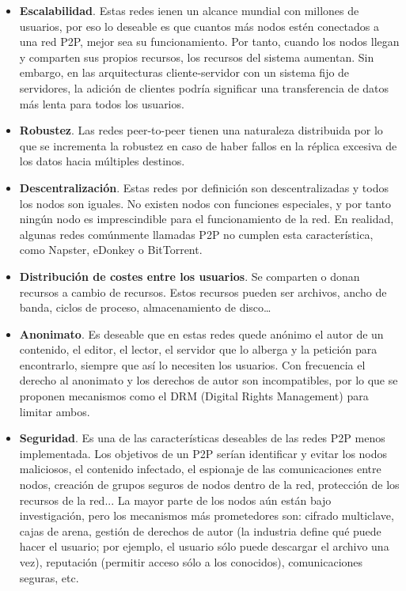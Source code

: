 \documentclass[11pt,a4paper]{article}
\begin{document}
\begin{itemize}

	\item \textbf{Escalabilidad}. Estas redes ienen un alcance mundial con millones de usuarios, por eso lo deseable es que cuantos más nodos estén conectados a una red P2P, mejor sea su funcionamiento. Por tanto, cuando los nodos llegan y comparten sus propios recursos, los recursos del sistema aumentan. Sin embargo, en las arquitecturas cliente-servidor con un sistema fijo de servidores, la adición de clientes podría significar una transferencia de datos más lenta para todos los usuarios.
	
	\item \textbf{Robustez}. Las redes peer-to-peer tienen una naturaleza distribuida por lo que se incrementa la robustez en caso de haber fallos en la réplica excesiva de los datos hacia múltiples destinos.
	
	\item \textbf{Descentralización}. Estas redes por definición son descentralizadas y todos los nodos son iguales. No existen nodos con funciones especiales, y por tanto ningún nodo es imprescindible para el funcionamiento de la red. En realidad, algunas redes comúnmente llamadas P2P no cumplen esta característica, como Napster, eDonkey o BitTorrent.
	
	\item \textbf{Distribución de costes entre los usuarios}. Se comparten o donan recursos a cambio de recursos. Estos recursos pueden ser archivos, ancho de banda, ciclos de proceso, almacenamiento de disco…
	
	\item \textbf{Anonimato}. Es deseable que en estas redes quede anónimo el autor de un contenido, el editor, el lector, el servidor que lo alberga y la petición para encontrarlo, siempre que así lo necesiten los usuarios. Con frecuencia el derecho al anonimato y los derechos de autor son incompatibles, por lo que se proponen mecanismos como el DRM (Digital Rights Management) para limitar ambos.
	
	\item \textbf{Seguridad}. Es una de las características deseables de las redes P2P menos implementada. Los objetivos de un P2P serían identificar y evitar los nodos maliciosos, el contenido infectado, el espionaje de las comunicaciones entre nodos, creación de grupos seguros de nodos dentro de la red, protección de los recursos de la red... La mayor parte de los nodos aún están bajo investigación, pero los mecanismos más prometedores son: cifrado multiclave, cajas de arena, gestión de derechos de autor (la industria define qué puede hacer el usuario; por ejemplo, el usuario sólo puede descargar el archivo una vez), reputación (permitir acceso sólo a los conocidos), comunicaciones seguras, etc.
	
\end{itemize}
\end{document}
